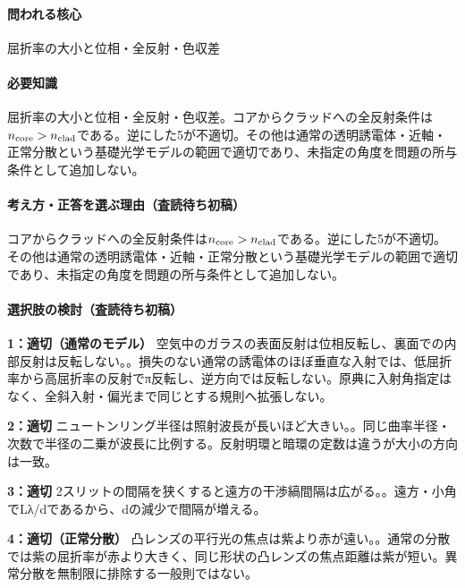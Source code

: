 \paragraph{問われる核心} 屈折率の大小と位相・全反射・色収差

\paragraph{必要知識} 屈折率の大小と位相・全反射・色収差。コアからクラッドへの全反射条件は\(n_{\rm core}>n_{\rm clad}\)である。逆にした5が不適切。その他は通常の透明誘電体・近軸・正常分散という基礎光学モデルの範囲で適切であり、未指定の角度を問題の所与条件として追加しない。

\paragraph{考え方・正答を選ぶ理由（査読待ち初稿）} コアからクラッドへの全反射条件は\(n_{\rm core}>n_{\rm clad}\)である。逆にした5が不適切。その他は通常の透明誘電体・近軸・正常分散という基礎光学モデルの範囲で適切であり、未指定の角度を問題の所与条件として追加しない。

\paragraph{選択肢の検討（査読待ち初稿）}\mbox{}\par

\noindent\textbf{1：適切（通常のモデル）} 空気中のガラスの表面反射は位相反転し、裏面での内部反射は反転しない。。損失のない通常の誘電体のほぼ垂直な入射では、低屈折率から高屈折率の反射でπ反転し、逆方向では反転しない。原典に入射角指定はなく、全斜入射・偏光まで同じとする規則へ拡張しない。\par

\noindent\textbf{2：適切} ニュートンリング半径は照射波長が長いほど大きい。。同じ曲率半径・次数で半径の二乗が波長に比例する。反射明環と暗環の定数は違うが大小の方向は一致。\par

\noindent\textbf{3：適切} 2スリットの間隔を狭くすると遠方の干渉縞間隔は広がる。。遠方・小角でLλ/dであるから、dの減少で間隔が増える。\par

\noindent\textbf{4：適切（正常分散）} 凸レンズの平行光の焦点は紫より赤が遠い。。通常の分散では紫の屈折率が赤より大きく、同じ形状の凸レンズの焦点距離は紫が短い。異常分散を無制限に排除する一般則ではない。\par

